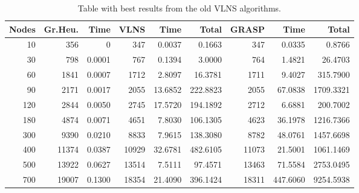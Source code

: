 \documentclass[a4paper]{scrartcl}
\begin{document}
\begin{table}
  \small
    \begin{adjustwidth}{-.5in}{-.5in}  
        \begin{center}
\begin{tabular}{r | r | r | r | r | r | r | r | r}
\hline
Nodes & Gr.Heu. & Time &  VLNS & Time & Total & GRASP & Time & Total \\
\hline \hline 
10 & 356 & 0 & 347 & 0.0037 & 0.1663 & 347 & 0.0335 & 0.8766 \\
\hline
30 & 798 & 0.0001 & 767 & 0.1394 & 3.0000 & 764 & 1.4821 & 26.4703 \\
\hline
60 & 1841 & 0.0007 & 1712 & 2.8097 & 16.3781 & 1711 & 9.4027 & 315.7900 \\
\hline
90 & 2171 & 0.0017 & 2055 & 13.6852 & 222.8823 & 2055 & 67.0838 & 1709.3321\\
\hline
120 & 2844 & 0.0050 & 2745 & 17.5720 & 194.1892 & 2712 & 6.6881 & 200.7002 \\
\hline
180 & 4874 & 0.0071 & 4651 & 7.8030 & 106.1305 & 4623 & 36.1978 & 1216.7366 \\
\hline
300 & 9390 & 0.0210 & 8833 & 7.9615 & 138.3080 & 8782 & 48.0761 & 1457.6698 \\
\hline
400 & 11374 & 0.0387 & 10929 & 32.6781 & 482.6105 & 11073 & 21.5001 & 1061.1469 \\
\hline
500 & 13922 & 0.0627 & 13514 & 7.5111 & 97.4571 & 13463 & 71.5584 & 2753.0495 \\
\hline
700 & 19007 & 0.1300 & 18354 & 21.4090 & 396.1424 & 18311 & 447.6060 & 9254.5938 \\
\hline
\end{tabular}

        \caption{Table with best results from the old VLNS algorithms. }
        \label{myTable1}
        \end{center}
    \end{adjustwidth}
\end{table}
\end{document}
